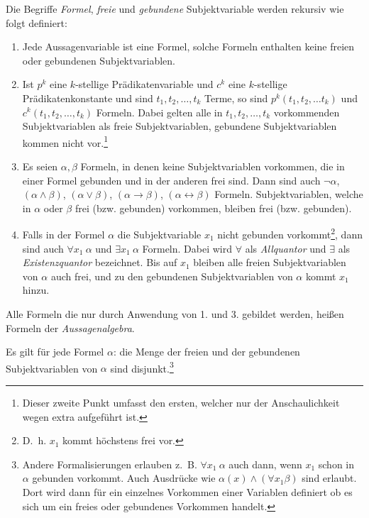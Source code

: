 \documentclass[a4paper,german,10pt,twoside]{book}
\theoremstyle{definition}
\theoremstyle{remark}
\begin{document}
\par
Die Begriffe \emph{Formel}, \emph{freie} und 
\emph{gebundene} Subjektvariable 
werden rekursiv wie folgt definiert:

\begin{enumerate}

\item Jede Aussagenvariable ist eine Formel, solche Formeln enthalten 
keine freien oder gebundenen Subjektvariablen. 
\item Ist $p^k$ eine $k$-stellige Pr{\"a}dikatenvariable und $c^k$ eine 
$k$-stellige Pr{\"a}dikatenkonstante und sind $t_1, t_2, \ldots, t_k$ Terme, 
so sind $p^k(t_1, t_2, \ldots t_k)$ und 
$c^k(t_1, t_2, \ldots, t_k)$ Formeln. Dabei gelten alle in 
$t_1, t_2, \ldots, t_k$ vorkommenden Subjektvariablen als freie 
Subjektvariablen, gebundene Subjektvariablen kommen nicht 
vor.\footnote{Dieser zweite Punkt umfasst den ersten, welcher nur der 
Anschaulichkeit wegen extra aufgef{\"u}hrt ist.} 

\item Es seien $\alpha, \beta$ Formeln, in denen keine Subjektvariablen 
vorkommen, die in einer Formel gebunden und in der anderen frei sind. 
Dann sind auch $\neg \alpha$, $(\alpha \land \beta)$, 
$(\alpha \lor \beta)$, $(\alpha \rightarrow \beta)$,
$(\alpha \leftrightarrow \beta)$ Formeln. Subjektvariablen, welche in 
$\alpha$ oder $\beta$ frei (bzw. gebunden) vorkommen, bleiben frei (bzw. 
gebunden).

\item Falls in der Formel $\alpha$ die Subjektvariable $x_1$ nicht
gebunden vorkommt\footnote{D.~h. $x_1$ kommt h{\"o}chstens frei vor.}, 
dann sind auch $\forall x_1~\alpha$ und $\exists x_1~\alpha$ 
Formeln. Dabei wird $\forall$ als
\emph{Allquantor} und $\exists$ 
als
\emph{Existenzquantor} 
bezeichnet. Bis auf $x_1$ bleiben alle freien Subjektvariablen von 
$\alpha$ auch frei, und zu den gebundenen Subjektvariablen von $\alpha$ 
kommt $x_1$ hinzu. 

\end{enumerate}
Alle Formeln die nur durch Anwendung von 1. und 3. gebildet werden, 
hei{\ss}en Formeln der \emph{Aussagenalgebra}. 

\par
Es gilt f{\"u}r jede Formel $\alpha$: die Menge der freien und der
gebundenen Subjektvariablen von $\alpha$ sind disjunkt.\footnote{
Andere Formalisierungen erlauben z.~B. $\forall x_1~\alpha$ auch dann, wenn
$x_1$ schon in $\alpha$ gebunden vorkommt. Auch Ausdr{\"u}cke wie 
$\alpha(x) \land (\forall x_1 \beta)$ sind erlaubt. Dort wird dann
f{\"u}r ein einzelnes Vorkommen einer Variablen definiert ob es sich um ein
freies oder gebundenes Vorkommen handelt.}
\end{document}
